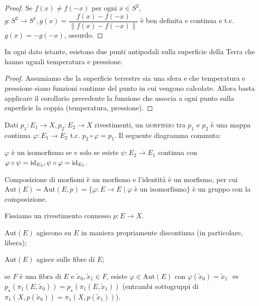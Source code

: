 \begin{proof}
  Se $f(x) \not=f(-x)$ per ogni $x \in S^2$, $g:S^2 \longrightarrow S^1, g(x)=\dfrac{f(x)-f(-x)}{\|f(x)-f(-x)\|}$ è ben definita e continua e t.c. $g(x)=-g(-x)$, assurdo.
\end{proof}

\begin{cor}
  In ogni dato istante, esistono due punti antipodali sulla superficie della Terra che hanno uguali temperatura e pressione.
\end{cor}

\begin{proof}
  Assumiamo che la superficie terrestre sia una sfera e che temperatura e pressione siano funzioni continue del punto in cui vengono calcolate. Allora basta applicare il corollario precedente la funzione che associa a ogni punto sulla superficie la coppia (temperatura, pressione).
\end{proof}

\begin{defn}
  Dati $p_1:E_1 \longrightarrow X, p_2:E_2 \longrightarrow X$ rivestimenti, un \textsc{morfismo} tra $p_1$ e $p_2$ è una mappa continua $\varphi:E_1 \longrightarrow E_2$ t.c. $p_2 \circ \varphi=p_1$. Il seguente diagramma commuta:
  \begin{center}
  \end{center}
  $\varphi$ è un isomorfismo se e solo se esiste $\psi:E_2 \longrightarrow E_1$ continua con $\varphi \circ \psi=\operatorname{id}_{E_2}, \psi \circ \varphi=\operatorname{id}_{E_1}$.
\end{defn}

Composizione di morfismi è un morfismo e l'identità è un morfismo, per cui $\text{Aut}(E)=\text{Aut}(E, p)=\{\varphi:E \longrightarrow E \mid \varphi \text{ è un isomorfismo}\}$ è un gruppo con la composizione.

Fissiamo un rivestimento connesso $p:E \longrightarrow X$.

\begin{thm}
  \begin{nlist}
    \item $\text{Aut}(E)$ agiscono su $E$ in maniera propriamente discontinua (in particolare, libera);
    \item $\text{Aut}(E)$ agisce sulle fibre di $E$;
    \item se $F$ è una fibra di $E$ e $\tilde{x}_0, \tilde{x}_1 \in F$, esiste $\varphi \in \text{Aut}(E)$ con $\varphi(\tilde{x}_0)=\tilde{x}_1$ $\iff$ $p_{\star}(\pi_1(E, \tilde{x}_0))=p_{\star}(\pi_1(E, \tilde{x}_1))$
    (entrambi sottogruppi di $\pi_1(X, p(\tilde{x}_0))=\pi_1(X, p(\tilde{x}_1))$).
  \end{nlist}
\end{thm}


